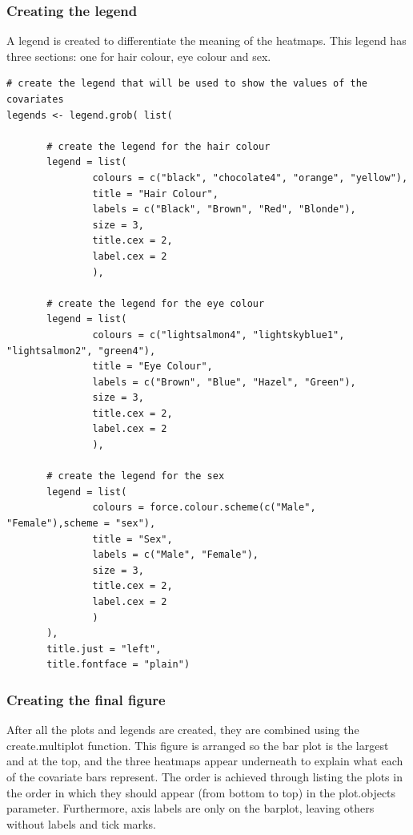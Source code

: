 \documentclass[letterpaper]{article}
\begin{document}
\subsubsection {Creating the legend}
A legend is created to differentiate the meaning of the heatmaps. This legend has three sections: one for hair colour, eye colour and sex.

\begin{verbatim}
# create the legend that will be used to show the values of the covariates
legends <- legend.grob( list(

       # create the legend for the hair colour
       legend = list(
               colours = c("black", "chocolate4", "orange", "yellow"),
               title = "Hair Colour",
               labels = c("Black", "Brown", "Red", "Blonde"),
               size = 3,
               title.cex = 2,
               label.cex = 2
               ),

       # create the legend for the eye colour
       legend = list(
               colours = c("lightsalmon4", "lightskyblue1", "lightsalmon2", "green4"),
               title = "Eye Colour",
               labels = c("Brown", "Blue", "Hazel", "Green"),
               size = 3,
               title.cex = 2,
               label.cex = 2
               ),

       # create the legend for the sex
       legend = list(
               colours = force.colour.scheme(c("Male", "Female"),scheme = "sex"),
               title = "Sex",
               labels = c("Male", "Female"),
               size = 3,
               title.cex = 2,
               label.cex = 2
               )
       ), 
       title.just = "left", 
       title.fontface = "plain")
\end{verbatim}

\subsubsection{Creating the final figure}
After all the plots and legends are created, they are combined using the create.multiplot function. This figure is arranged so the bar plot is the largest and at the top, and the three heatmaps appear underneath to explain what each of the covariate bars represent. The order is achieved through listing the plots in the order in which they should appear (from bottom to top) in the plot.objects parameter. Furthermore, axis labels are only on the barplot, leaving others without labels and tick marks.
\end{document}
